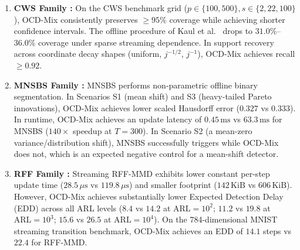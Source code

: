 \documentclass[lettersize,journal]{IEEEtran}
\begin{document}
\begin{enumerate}
    \item \textbf{CWS Family \cite{chen2024high}:} On the CWS benchmark grid ($p \in \{100, 500\}, s \in \{2, 22, 100\}$), OCD-Mix consistently preserves $\ge 95\%$ coverage while achieving shorter confidence intervals. The offline procedure of Kaul et al.~\cite{kaul2019efficient} drops to $31.0\%$--$36.0\%$ coverage under sparse streaming dependence. In support recovery across coordinate decay shapes (uniform, $j^{-1/2}$, $j^{-1}$), OCD-Mix achieves recall $\ge 0.92$.
    \item \textbf{MNSBS Family \cite{madridpadilla2023nonparametric}:} MNSBS performs non-parametric offline binary segmentation. In Scenarios S1 (mean shift) and S3 (heavy-tailed Pareto innovations), OCD-Mix achieves lower scaled Hausdorff error ($0.327$ vs $0.333$). In runtime, OCD-Mix achieves an update latency of $0.45\,\text{ms}$ vs $63.3\,\text{ms}$ for MNSBS ($140\times$ speedup at $T=300$). In Scenario S2 (a mean-zero variance/distribution shift), MNSBS successfully triggers while OCD-Mix does not, which is an expected negative control for a mean-shift detector.
    \item \textbf{RFF Family \cite{kalinke2025streaming}:} Streaming RFF-MMD exhibits lower constant per-step update time ($28.5\,\mu\text{s}$ vs $119.8\,\mu\text{s}$) and smaller footprint ($142\,\text{KiB}$ vs $606\,\text{KiB}$). However, OCD-Mix achieves substantially lower Expected Detection Delay (EDD) across all ARL levels ($8.4$ vs $14.2$ at $\text{ARL}=10^2$; $11.2$ vs $19.8$ at $\text{ARL}=10^3$; $15.6$ vs $26.5$ at $\text{ARL}=10^4$). On the 784-dimensional MNIST streaming transition benchmark, OCD-Mix achieves an EDD of $14.1$ steps vs $22.4$ for RFF-MMD.
\end{enumerate}
\end{document}
